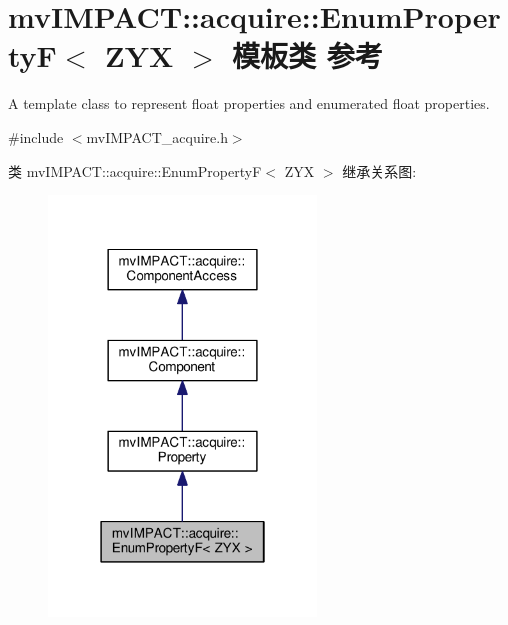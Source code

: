 \hypertarget{classmv_i_m_p_a_c_t_1_1acquire_1_1_enum_property_f}{\section{mv\+I\+M\+P\+A\+C\+T\+:\+:acquire\+:\+:Enum\+Property\+F$<$ Z\+Y\+X $>$ 模板类 参考}
\label{classmv_i_m_p_a_c_t_1_1acquire_1_1_enum_property_f}
}


A template class to represent float properties and enumerated float properties.  




{\ttfamily \#include $<$mv\+I\+M\+P\+A\+C\+T\+\_\+acquire.\+h$>$}



类 mv\+I\+M\+P\+A\+C\+T\+:\+:acquire\+:\+:Enum\+Property\+F$<$ Z\+Y\+X $>$ 继承关系图\+:
\nopagebreak
\begin{figure}[H]
\begin{center}
\leavevmode
\includegraphics[width=202pt]{classmv_i_m_p_a_c_t_1_1acquire_1_1_enum_property_f__inherit__graph}
\end{center}
\end{figure}


